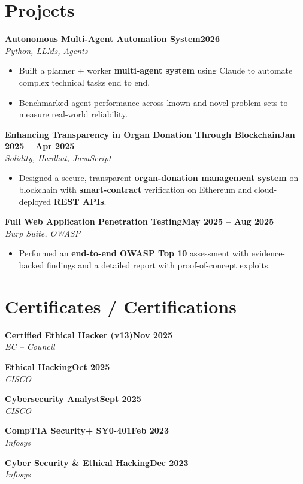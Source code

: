 \documentclass[a4paper,10pt]{article}
\newcommand{\entry}[3]{\textbf{#1}\hfill\textbf{#3}\\[1pt]{\itshape #2}\par\vspace{2pt}}
\begin{document}
\section*{Projects}
\entry{Autonomous Multi-Agent Automation System}{Python, LLMs, Agents}{2026}
\begin{itemize}
  \item Built a planner + worker \textbf{multi-agent system} using Claude to automate complex technical tasks end to end.
  \item Benchmarked agent performance across known and novel problem sets to measure real-world reliability.
\end{itemize}
\vspace{3pt}
\entry{Enhancing Transparency in Organ Donation Through Blockchain}{Solidity, Hardhat, JavaScript}{Jan 2025 -- Apr 2025}
\begin{itemize}
  \item Designed a secure, transparent \textbf{organ-donation management system} on blockchain with \textbf{smart-contract} verification on Ethereum and cloud-deployed \textbf{REST APIs}.
\end{itemize}
\vspace{3pt}
\entry{Full Web Application Penetration Testing}{Burp Suite, OWASP}{May 2025 -- Aug 2025}
\begin{itemize}
  \item Performed an \textbf{end-to-end OWASP Top 10} assessment with evidence-backed findings and a detailed report with proof-of-concept exploits.
\end{itemize}

\section*{Certificates / Certifications}
\textbf{Certified Ethical Hacker (v13)}\hfill\textbf{Nov 2025}\\{\itshape EC -- Council}\par\vspace{2pt}
\textbf{Ethical Hacking}\hfill\textbf{Oct 2025}\\{\itshape CISCO}\par\vspace{2pt}
\textbf{Cybersecurity Analyst}\hfill\textbf{Sept 2025}\\{\itshape CISCO}\par\vspace{2pt}
\textbf{CompTIA Security+ SY0-401}\hfill\textbf{Feb 2023}\\{\itshape Infosys}\par\vspace{2pt}
\textbf{Cyber Security \& Ethical Hacking}\hfill\textbf{Dec 2023}\\{\itshape Infosys}\par
\end{document}
